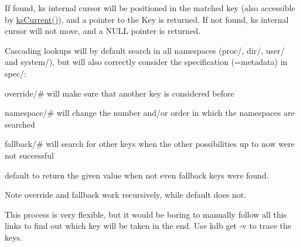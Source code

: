 If found, {\ttfamily ks} internal cursor will be positioned in the matched key (also accessible by \hyperlink{group__keyset_ga4287b9416912c5f2ab9c195cb74fb094}{ks\+Current()}), and a pointer to the Key is returned. If not found, {\ttfamily ks} internal cursor will not move, and a N\+U\+LL pointer is returned.

Cascading lookups will by default search in all namespaces (proc/, dir/, user/ and system/), but will also correctly consider the specification (=metadata) in spec/\+:


\begin{DoxyItemize}
\item {\ttfamily override/\#} will make sure that another key is considered before
\item {\ttfamily namespace/\#} will change the number and/or order in which the namespaces are searched
\item {\ttfamily fallback/\#} will search for other keys when the other possibilities up to now were not successful
\item {\ttfamily default} to return the given value when not even {\ttfamily fallback} keys were found.
\end{DoxyItemize}

\begin{DoxyNote}{Note}
override and fallback work recursively, while default does not.
\end{DoxyNote}
This process is very flexible, but it would be boring to manually follow all this links to find out which key will be taken in the end. Use {\ttfamily kdb get -\/v} to trace the keys.

